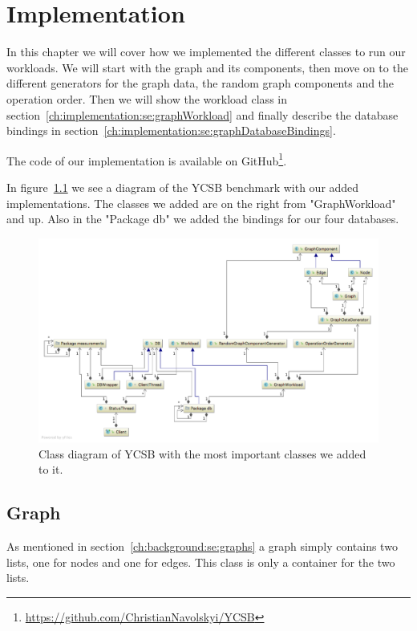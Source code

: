 \chapter{Implementation}
\label{ch:implementation}
In this chapter we will cover how we implemented the different classes to run our workloads.
We will start with the graph and its components,
then move on to the different generators for the graph data,
the random graph components and the operation order.
Then we will show the workload class in section~\ref{ch:implementation:se:graphWorkload} and finally describe the database bindings in section~\ref{ch:implementation:se:graphDatabaseBindings}.

The code of our implementation is available on GitHub\footnote{\url{https://github.com/ChristianNavolskyi/YCSB}}.

In figure~\ref{fig:YCSBExtension} we see a diagram of the YCSB benchmark with our added implementations.
The classes we added are on the right from "GraphWorkload" and up.
Also in the "Package db" we added the bindings for our four databases.

\begin{figure}
  \includegraphics[angle=90,height=\textheight]{images/benchmarks/extendedYCSBWorkflow}
  \caption{Class diagram of YCSB with the most important classes we added to it.}
  \label{fig:YCSBExtension}
\end{figure}

\section{Graph}
As mentioned in section~\ref{ch:background:se:graphs} a graph simply contains two lists,
one for nodes and one for edges.
This class is only a container for the two lists.

